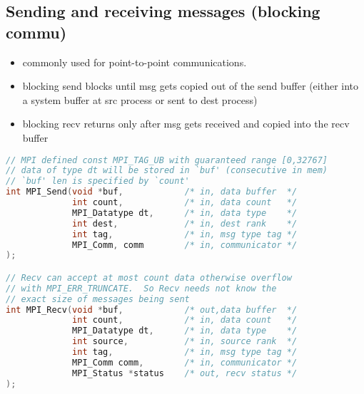 \subsection*{Sending and receiving messages (blocking commu)}
\begin{itemize}
\item commonly used for point-to-point communications.
\item blocking send blocks until msg gets copied out of the send buffer (either into a system buffer at src process or sent to dest process)
\item blocking recv returns only after msg gets received and copied into the recv buffer
\end{itemize}
\begin{lstlisting}[language=c]
// MPI defined const MPI_TAG_UB with guaranteed range [0,32767]
// data of type dt will be stored in `buf' (consecutive in mem)
// `buf' len is specified by `count'
int MPI_Send(void *buf,            /* in, data buffer  */
             int count,            /* in, data count   */
             MPI_Datatype dt,      /* in, data type    */
             int dest,             /* in, dest rank    */
             int tag,              /* in, msg type tag */
             MPI_Comm, comm        /* in, communicator */
);

// Recv can accept at most count data otherwise overflow
// with MPI_ERR_TRUNCATE.  So Recv needs not know the
// exact size of messages being sent
int MPI_Recv(void *buf,            /* out,data buffer  */
             int count,            /* in, data count   */
             MPI_Datatype dt,      /* in, data type    */
             int source,           /* in, source rank  */
             int tag,              /* in, msg type tag */
             MPI_Comm comm,        /* in, communicator */
             MPI_Status *status    /* out, recv status */
);
\end{lstlisting}
